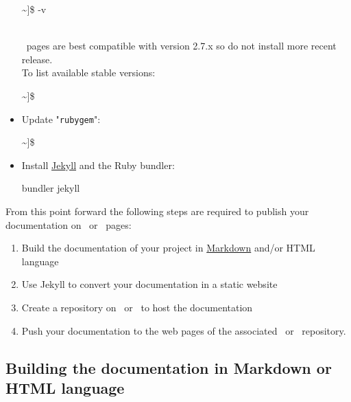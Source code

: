 \begin{itemize}
{{\begin{scripti}
\textasciitilde]\$  -v
\end{scripti}
}}
\\[-0.5cm]
\noindent \github\ pages are best compatible with version 2.7.x so do not install more recent release. \\
To list available stable versions:
{\footnotesize{
\begin{scripti}
\textasciitilde]\$   
\end{scripti}
}}
\item Update "\texttt{rubygem}":
{\footnotesize{
\begin{scripti}
\textasciitilde]\$   
\end{scripti}
}}
\item Install \href{https://jekyllrb.com}{Jekyll} and the Ruby bundler:
\vspace{-0.25cm}
\begin{scripti}
\fprompt{~}   bundler jekyll
\end{scripti}
\end{itemize}
From this point forward the following steps are required to publish your documentation on \github\ or \gitlab\ pages:
\begin{enumerate}
\item Build the documentation of your project in \href{https://www.markdownguide.org/}{Markdown} and/or HTML language
\item Use Jekyll to convert your documentation in a static website
\item Create a repository on \github\ or \gitlab\ to host the documentation
\item Push your documentation to the web pages of the associated \github\ or \gitlab\ repository. 
\end{enumerate}

\subsection{Building the documentation in Markdown or HTML language}

